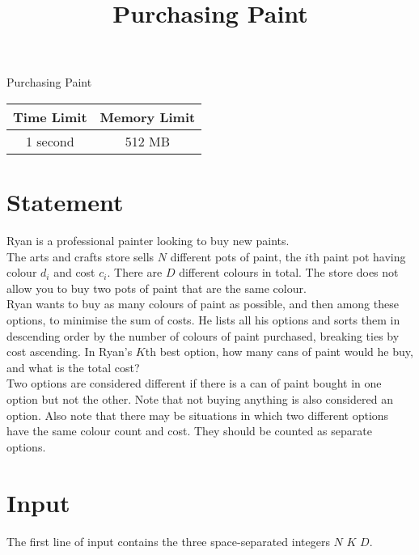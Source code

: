 \documentclass{article}
\begin{document}
\title{\vspace{-5ex}Purchasing Paint}
\author{\vspace{-5ex}}
\date{\vspace{-5ex}}
\pagestyle{fancy}
\fancyhf{}

\begin{center}
\huge{Purchasing Paint}\small\\
\vspace{5ex}
\begin{tabular}{|c|c|}
\hline
Time Limit & Memory Limit \\
\hline
1 second & 512 MB \\

\hline
\end{tabular}
\end{center}
\section*{Statement}
Ryan is a professional painter looking to buy new paints.\\

The arts and crafts store sells $N$ different pots of paint, the $i$th paint pot having colour $d_i$ and cost $c_i$. There are $D$ different colours in total. The store does not allow you to buy two pots of paint that are the same colour.\\

Ryan  wants to buy as many colours of paint as possible, and then among these options, to minimise the sum of costs. He lists all his options and sorts them in descending order by the number of colours of paint purchased, breaking ties by cost ascending. In Ryan's $K$th best option, how many cans of paint would he buy, and what is the total cost?\\

Two options are considered different if there is a can of paint bought in one option but not the other. Note that not buying anything is also considered an option. Also note that there may be situations in which two different options have the same colour count and cost. They should be counted as separate options.

\section*{Input}
The first line of input contains the three space-separated integers $N$ $K$ $D$. \\
\end{document}
